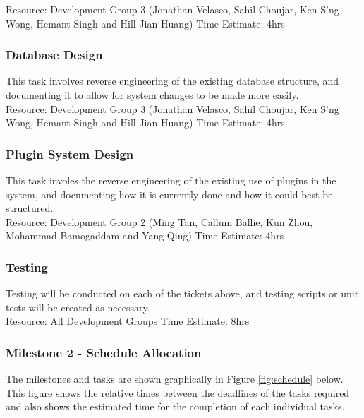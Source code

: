 \documentclass{article}
\begin{document}
	Resource: Development Group 3 (Jonathan Velasco, Sahil Choujar, Ken S'ng Wong, Hemant Singh and Hill-Jian Huang)
	Time Estimate: 4hrs
	
\subsubsection{Database Design}
	This task involves reverse engineering of the existing database structure, and documenting it to allow for system changes to be made more easily.\\
	
	Resource: Development Group 3 (Jonathan Velasco, Sahil Choujar, Ken S'ng Wong, Hemant Singh and Hill-Jian Huang)
	Time Estimate: 4hrs

\subsubsection{Plugin System Design}
	This task involes the reverse engineering of the existing use of plugins in the system, and documenting how it is currently done and how it could best be structured.\\
	
	Resource: Development Group 2 (Ming Tan, Callum Ballie, Kun Zhou, Mohammad Bamogaddam and Yang Qing)
	Time Estimate: 4hrs
	
\subsubsection{Testing}
	Testing will be conducted on each of the tickets above, and testing scripts or unit tests will be created as necessary.\\
	
	Resource: All Development Groups
	Time Estimate: 8hrs

\subsubsection{Milestone 2 - Schedule Allocation}

The milestones and tasks are shown graphically in Figure \ref{fig:schedule} below. This figure shows the relative times between the deadlines of the tasks required and also shows the estimated time for the completion of each individual tasks.\\
\end{document}
